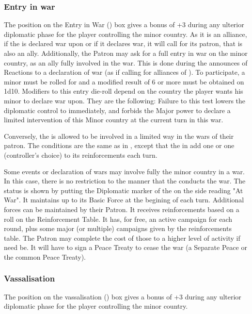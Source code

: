 \subsubsection{Entry in war}\label{chDiplo:EW Effects}
\aparag The position on the Entry in War (\EW) box gives a bonus of +3 during
any ulterior diplomatic phase for the player controlling the minor country.
\aparag[Alliance.] As it is an alliance, if the \MIN is declared war upon or
if it declares war, it will call for its patron, that is also an ally.
\bparag Additionally, the Patron may ask for a full entry in war on the minor
country, as an ally fully involved in the war. This is done during the
announces of Reactions to a declaration of war (as if calling for alliances of
\MAJ).  To participate, a minor must be rolled for and a modified result of 6
or more must be obtained on 1d10.
\bparag
Modifiers to this entry die-roll depend on the country the player wants his
minor to declare war upon. They are the following: \diplowar
\bparag Failure to this test lowers the diplomatic control to \CE immediately,
and forbids the Major power to declare a limited intervention of this Minor
country at the current turn in this war.

Conversely, the \MIN is allowed to be involved in a limited way in the wars of
their patron. The conditions are the same as in \AM, except that the \MIN in
\EG add one \LD or one \ND (controller's choice) to its reinforcements each
turn.

\label{chDiplo:Entry War Minor}
Some events or declaration of wars may involve fully the minor country in a
war.
\bparag In this case, there is no restriction to the manner that the \MIN
conducts the war. The status is shown by putting the Diplomatic marker of the
\MIN on the side reading "At War".
\bparag It maintains up to its Basic Force at the begining of each turn.
Additional forces can be maintained by their Patron.
\bparag It receives reinforcements based on a roll on the Reinforcement Table.
It has, for free, an active campaign for each round, plus some major (or
multiple) campaigns given by the reinforcements table. The Patron may complete
the cost of those to a higher level of activity if need be.
\bparag It will have to sign a Peace Treaty to cease the war (a Separate Peace
or the common Peace Treaty).


\subsubsection{Vassalisation}
\aparag The position on the vassalisation (\VASSAL) box gives a bonus of +3
during any ulterior diplomatic phase for the player controlling the minor
country.

